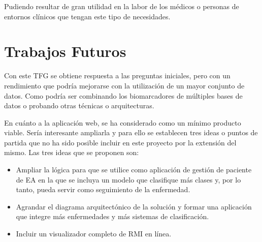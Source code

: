 Pudiendo resultar de gran utilidad en la labor de los médicos o personas de entornos clínicos que tengan este tipo de
necesidades.


\section{Trabajos Futuros}\label{sec:trabajos-futuros}
Con este TFG se obtiene respuesta a las preguntas iniciales, pero con un rendimiento que podría mejorarse con la
utilización de un mayor conjunto de datos.
Como podría ser combinando los biomarcadores de múltiples bases de datos o probando otras técnicas o arquitecturas.

En cuánto a la aplicación web, se ha considerado como un mínimo producto viable.
Sería interesante ampliarla y para ello se establecen tres ideas o puntos de partida que no ha sido posible incluir en
este proyecto por la extensión del mismo.
Las tres ideas que se proponen son:
\begin{itemize}
    \item Ampliar la lógica para que se utilice como aplicación de gestión de paciente de EA en la que se incluya un
    modelo que clasifique más clases y, por lo tanto, pueda servir como seguimiento de la enfermedad.
    \item Agrandar el diagrama arquitectónico de la solución y formar una aplicación que integre más enfermedades y más
    sistemas de clasificación.
    \item Incluir un visualizador completo de RMI en línea.
\end{itemize}
